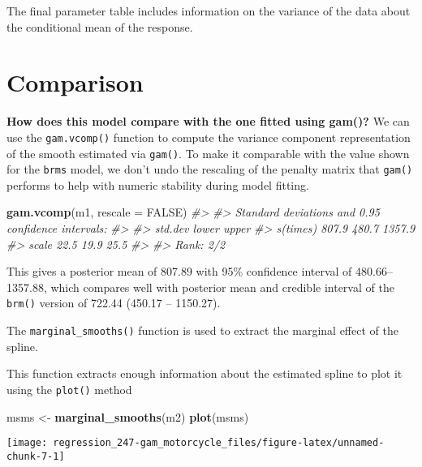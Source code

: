 \documentclass[]{book}
\newenvironment{Shaded}{\begin{snugshade}}{\end{snugshade}}
\newcommand{\CommentTok}[1]{\textcolor[rgb]{0.56,0.35,0.01}{\textit{#1}}}
\newcommand{\DataTypeTok}[1]{\textcolor[rgb]{0.13,0.29,0.53}{#1}}
\newcommand{\KeywordTok}[1]{\textcolor[rgb]{0.13,0.29,0.53}{\textbf{#1}}}
\newcommand{\NormalTok}[1]{#1}
\newcommand{\OtherTok}[1]{\textcolor[rgb]{0.56,0.35,0.01}{#1}}
\newcommand{\StringTok}[1]{\textcolor[rgb]{0.31,0.60,0.02}{#1}}
\begin{document}
The final parameter table includes information on the variance of the data about the conditional mean of the response.

\hypertarget{comparison}{%
\section{Comparison}\label{comparison}}

\textbf{How does this model compare with the one fitted using gam()?} We can use the \texttt{gam.vcomp()} function to compute the variance component representation of the smooth estimated via \texttt{gam()}. To make it comparable with the value shown for the \texttt{brms} model, we don't undo the rescaling of the penalty matrix that \texttt{gam()} performs to help with numeric stability during model fitting.\\

\begin{Shaded}
\begin{Highlighting}[]
\KeywordTok{gam.vcomp}\NormalTok{(m1, }\DataTypeTok{rescale =} \OtherTok{FALSE}\NormalTok{)}
\CommentTok{#> }
\CommentTok{#> Standard deviations and 0.95 confidence intervals:}
\CommentTok{#> }
\CommentTok{#>          std.dev lower  upper}
\CommentTok{#> s(times)   807.9 480.7 1357.9}
\CommentTok{#> scale       22.5  19.9   25.5}
\CommentTok{#> }
\CommentTok{#> Rank: 2/2}
\end{Highlighting}
\end{Shaded}

This gives a posterior mean of 807.89 with 95\% confidence interval of 480.66--1357.88, which compares well with posterior mean and credible interval of the \texttt{brm()} version of 722.44 (450.17 -- 1150.27).

The \texttt{marginal\_smooths()} function is used to extract the marginal effect of the spline.

This function extracts enough information about the estimated spline to plot it using the \texttt{plot()} method

\begin{Shaded}
\begin{Highlighting}[]
\NormalTok{msms <-}\StringTok{ }\KeywordTok{marginal_smooths}\NormalTok{(m2)}
\KeywordTok{plot}\NormalTok{(msms)}
\end{Highlighting}
\end{Shaded}

\begin{center}\texttt{[image: regression\_247-gam\_motorcycle\_files/figure-latex/unnamed-chunk-7-1]} \end{center}
\end{document}
